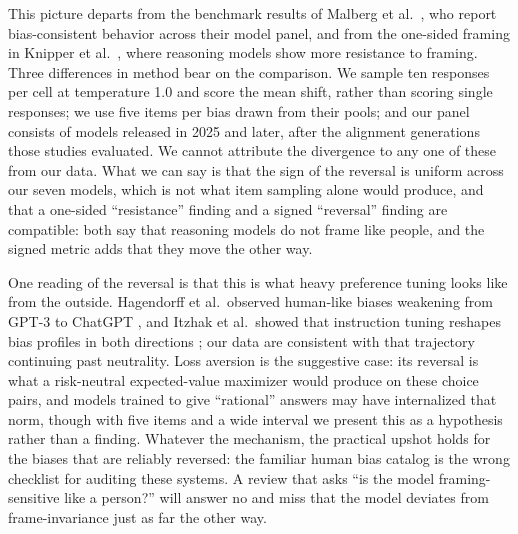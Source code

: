 \documentclass[conference]{IEEEtran}
\begin{document}
This picture departs from the benchmark results of Malberg et al.~\cite{malberg2024comprehensive}, who report bias-consistent behavior across their model panel, and from the one-sided framing in Knipper et al.~\cite{knipper2025bias}, where reasoning models show more resistance to framing. Three differences in method bear on the comparison. We sample ten responses per cell at temperature 1.0 and score the mean shift, rather than scoring single responses; we use five items per bias drawn from their pools; and our panel consists of models released in 2025 and later, after the alignment generations those studies evaluated. We cannot attribute the divergence to any one of these from our data. What we can say is that the sign of the reversal is uniform across our seven models, which is not what item sampling alone would produce, and that a one-sided ``resistance'' finding and a signed ``reversal'' finding are compatible: both say that reasoning models do not frame like people, and the signed metric adds that they move the other way.

One reading of the reversal is that this is what heavy preference tuning looks like from the outside. Hagendorff et al.\ observed human-like biases weakening from GPT-3 to ChatGPT \cite{hagendorff2023human}, and Itzhak et al.\ showed that instruction tuning reshapes bias profiles in both directions \cite{itzhak2024instructed}; our data are consistent with that trajectory continuing past neutrality. Loss aversion is the suggestive case: its reversal is what a risk-neutral expected-value maximizer would produce on these choice pairs, and models trained to give ``rational'' answers may have internalized that norm, though with five items and a wide interval we present this as a hypothesis rather than a finding. Whatever the mechanism, the practical upshot holds for the biases that are reliably reversed: the familiar human bias catalog is the wrong checklist for auditing these systems. A review that asks ``is the model framing-sensitive like a person?'' will answer no and miss that the model deviates from frame-invariance just as far the other way.
\end{document}
